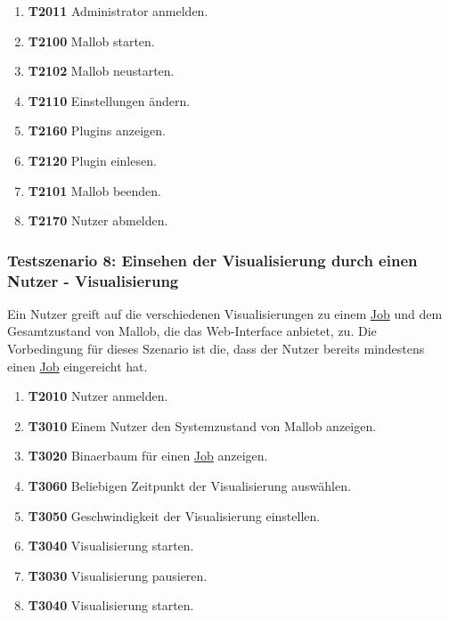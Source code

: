 \begin{enumerate}
    \item \textbf{T2011} \gls{Administrator} anmelden.
    
    \item \textbf{T2100} Mallob starten.
    
    \item \textbf{T2102} Mallob neustarten.
    
    \item \textbf{T2110} Einstellungen ändern.
    
    \item \textbf{T2160} Plugins anzeigen.
    
    \item \textbf{T2120} Plugin einlesen.

    \item \textbf{T2101} Mallob beenden.
    
    \item \textbf{T2170} \gls{Nutzer} abmelden.
\end{enumerate}

\subsubsection{Testszenario 8: Einsehen der Visualisierung durch einen Nutzer - Visualisierung}
Ein \gls{Nutzer} greift auf die verschiedenen Visualisierungen zu einem \hyperref[B:Jobs]{Job} und dem Gesamtzustand von Mallob, die das \gls{Web-Interface} anbietet, zu. Die Vorbedingung für dieses Szenario ist die, dass der \gls{Nutzer} bereits mindestens einen \hyperref[B:Jobs]{Job} eingereicht hat.

\begin{enumerate}
    \item \textbf{T2010} \gls{Nutzer} anmelden.
    
    \item \textbf{T3010} Einem \gls{Nutzer} den Systemzustand von Mallob anzeigen. 
    
    \item \textbf{T3020} \gls{Binaerbaum} für einen \hyperref[B:Jobs]{Job} anzeigen. 
    
    \item \textbf{T3060} Beliebigen Zeitpunkt der Visualisierung auswählen.
    
    \item \textbf{T3050} Geschwindigkeit der Visualisierung einstellen.
    
    \item \textbf{T3040} Visualisierung starten. 
    
    \item \textbf{T3030} Visualisierung pausieren.

    \item \textbf{T3040} Visualisierung starten. 
\end{enumerate}

